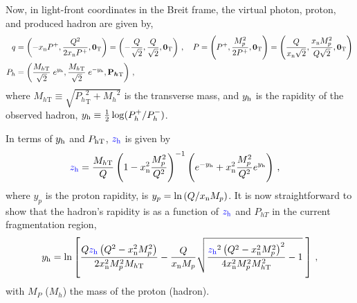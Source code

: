 \documentclass[final,3p,times,onecolumn,sort&compress,hidelinks]{elsarticle}
\newcommand{\xn}{\ensuremath{x_{\rm n}}}
\newcommand{\zh}{\ensuremath{{\cbl z_{\rm h}}}}
\newcommand{\Tsc}[2]{#1_{#2\text{T}}}
\newcommand{\Tscsq}[2]{#1^2_{#2\text{T}}}
\newcommand{\hady}{\ensuremath{y_{\rm h}}}
\newcommand{\PhT}{\ensuremath{P_{hT}}}
\newcommand{\hadp}{{\ensuremath{{\bf P}_h}}}
\newcommand{\hadpsc}{{\ensuremath{P_h}}}
\newcommand{\hadmass}{\ensuremath{M_h}}
\newcommand{\T}[2]{\boldsymbol{#1}_{#2\text{T}}}
\newcommand{\parz}[1]{\ensuremath{\left(#1\right)}}
\newcommand\3[1]{\boldsymbol{#1}}
\newcommand{\cbl}{\color{blue}}
\newcommand{\bea}{\begin{eqnarray}}
\newcommand{\eea}{\end{eqnarray}}
\begin{document}
{Now, in light-front coordinates in the Breit frame, the virtual photon, proton, and produced hadron are given by,
\begin{align}
  q &{}= \parz{-\xn P^+,\frac{Q^2}{2 \xn P^+}, \T{0}{} } = \parz{-\frac{Q}{\sqrt{2}},\frac{Q}{\sqrt{2}},\T{0}{} }\, , \quad  P {}= \parz{P^+,\frac{M_p^2}{2 P^+},\T{0}{} } = \parz{\frac{Q}{\xn \sqrt{2}},\frac{\xn M_p^2}{Q \sqrt{2} },\T{0}{} }\\ \hadpsc &{}= \parz{\frac{\Tsc{M}{h}}{\sqrt{2}} \; e^{\hady},\frac{\Tsc{M}{h}}{\sqrt{2}} \; e^{-\hady},\T{\hadp}{} }\, ,
  \label{eq:hadmom} 
\end{align}
where  $\Tsc{M}{h} \equiv \sqrt{ \Tscsq{\hadpsc}{} + \hadmass^2 }$ is the transverse mass, and  $\hady$ is the
rapidity of the observed hadron, $\hady\equiv \frac{1}{2}\log(P_h^+/P_h^-)$.

In terms of $\hady$ and $\Tsc{P}{\rm h}$, $\zh$ is given by
\begin{align}
\zh  &=  
   \frac{\Tsc{M}{h}}{Q} \parz{1-\xn^2 \frac{M_p^2}{Q^2}}^{-1} \parz{ e^{-\hady}  +
   \xn^2 \frac{M_p^2}{Q^2}  e^{\hady} }
   \, , 
\label{eq:z}
\end{align}%
where $y_p$ is the proton rapidity, is $y_p =  \ln \parz{Q/\xn M_p}$. It is 
now straightforward to show that the hadron's rapidity is as a function of $\zh$ and $\PhT$ in the current fragmentation region,
\bea
\hady =   \ln \left[\frac{Q \zh \left(Q^2-\xn^2 M_p^2\right)}{2 \xn^2 M_p^2
   \Tsc{M}{h} } - \frac{Q}{\xn M_p} \sqrt{\frac{\zh^2 \left(Q^2-\xn^2 M_p^2\right)^2}{4 \xn^2 M_p^2
   \Tsc{M}{h} ^2}- 1} \; \right] \, , 
\label{eq:rapvalue}
\eea
with $M_P$ ($M_h$) the mass of the proton (hadron).

}
\end{document}
